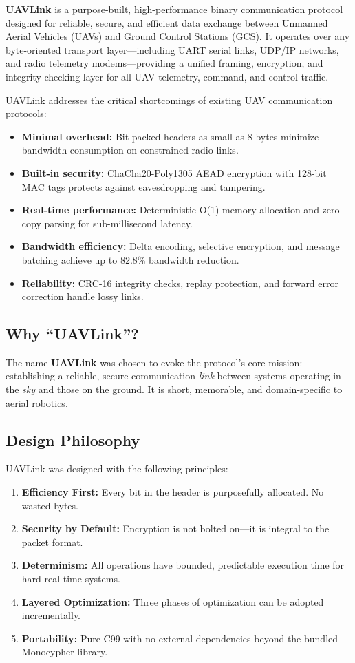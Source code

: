 \documentclass[11pt,a4paper]{article}
\begin{document}
\textbf{UAVLink} is a purpose-built, high-performance binary communication protocol designed for reliable, secure, and efficient data exchange between Unmanned Aerial Vehicles (UAVs) and Ground Control Stations (GCS). It operates over any byte-oriented transport layer---including UART serial links, UDP/IP networks, and radio telemetry modems---providing a unified framing, encryption, and integrity-checking layer for all UAV telemetry, command, and control traffic.

UAVLink addresses the critical shortcomings of existing UAV communication protocols:
\begin{itemize}[noitemsep]
    \item \textbf{Minimal overhead:} Bit-packed headers as small as 8 bytes minimize bandwidth consumption on constrained radio links.
    \item \textbf{Built-in security:} ChaCha20-Poly1305 AEAD encryption with 128-bit MAC tags protects against eavesdropping and tampering.
    \item \textbf{Real-time performance:} Deterministic O(1) memory allocation and zero-copy parsing for sub-millisecond latency.
    \item \textbf{Bandwidth efficiency:} Delta encoding, selective encryption, and message batching achieve up to 82.8\% bandwidth reduction.
    \item \textbf{Reliability:} CRC-16 integrity checks, replay protection, and forward error correction handle lossy links.
\end{itemize}

\subsection{Why ``UAVLink''?}

The name \textbf{UAVLink} was chosen to evoke the protocol's core mission: establishing a reliable, secure communication \emph{link} between systems operating in the \emph{sky} and those on the ground. It is short, memorable, and domain-specific to aerial robotics.

\subsection{Design Philosophy}

UAVLink was designed with the following principles:
\begin{enumerate}[noitemsep]
    \item \textbf{Efficiency First:} Every bit in the header is purposefully allocated. No wasted bytes.
    \item \textbf{Security by Default:} Encryption is not bolted on---it is integral to the packet format.
    \item \textbf{Determinism:} All operations have bounded, predictable execution time for hard real-time systems.
    \item \textbf{Layered Optimization:} Three phases of optimization can be adopted incrementally.
    \item \textbf{Portability:} Pure C99 with no external dependencies beyond the bundled Monocypher library.
\end{enumerate}
\end{document}
